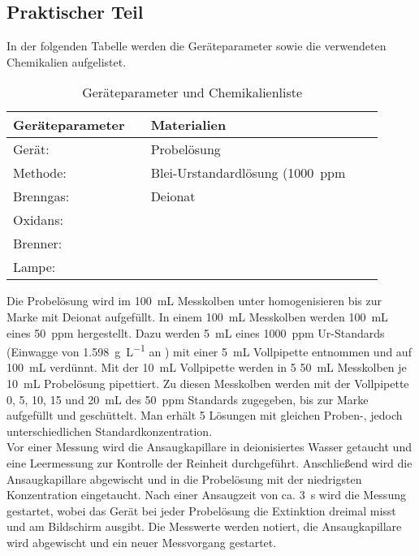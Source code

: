 \subsection{Praktischer Teil}
  
  In der folgenden Tabelle werden die Geräteparameter sowie die verwendeten Chemikalien aufgelistet.
  
  \begin{table}[H]
    \centering
    \caption[Geräteparameter und Chemikalienliste, Quelle: Autor]{Geräteparameter und Chemikalienliste}
    
    \label{tab:GerateparameterAAS}
    \begin{tabular}{@{}ll|lp{4.5cm}l@{}}
      \toprule
      Geräteparameter & & Materialien   \\ \midrule
        Gerät: &  & Probelösung  \\ 
        Methode: &  & Blei-Urstandardlösung (\SI[mode=text]{1000}{ppm} \\
        Brenngas: &  & Deionat \\
        Oxidans: &  &  \\
        Brenner: &  &  \\
        Lampe: &  &  \\ \bottomrule
    \end{tabular}
  \end{table}
  
  \noindent Die Probelösung wird im \SI[mode=text]{100}{\milli\liter} Messkolben unter homogenisieren bis zur Marke mit Deionat aufgefüllt. In einem \SI[mode=text]{100}{\milli\liter} Messkolben werden \SI[mode=text]{100}{\milli\liter} eines \SI[mode=text]{50}{ppm} hergestellt. Dazu werden \SI[mode=text]{5}{\milli\liter} eines \SI[mode=text]{1000}{ppm}  Ur-Standards (Einwagge von \SI[mode=text]{1.598}{\gram\per\liter} an ) mit einer \SI[mode=text]{5}{\milli\liter} Vollpipette entnommen und auf \SI[mode=text]{100}{\milli\liter} verdünnt. Mit der \SI[mode=text]{10}{\milli\liter} Vollpipette werden in 5 \SI[mode=text]{50}{\milli\liter} Messkolben je \SI[mode=text]{10}{\milli\liter} Probelösung pipettiert. Zu diesen Messkolben werden mit der Vollpipette 0, 5, 10, 15 und \SI[mode=text]{20}{\milli\liter} des \SI[mode=text]{50}{ppm}  Standards zugegeben, bis zur Marke aufgefüllt und geschüttelt. Man erhält 5 Lösungen mit gleichen Proben-, jedoch unterschiedlichen Standardkonzentration. \\
  
  Vor einer Messung wird die Ansaugkapillare in deionisiertes Wasser getaucht und eine Leermessung zur Kontrolle der Reinheit durchgeführt. Anschließend wird die Ansaugkapillare abgewischt und in die Probelösung mit der niedrigsten Konzentration eingetaucht. Nach einer Ansaugzeit von ca. \SI[mode=text]{3}{s} wird die Messung gestartet, wobei das Gerät bei jeder Probelösung die Extinktion dreimal misst und am Bildschirm ausgibt. Die Messwerte werden notiert, die Ansaugkapillare wird abgewischt und ein neuer Messvorgang gestartet.